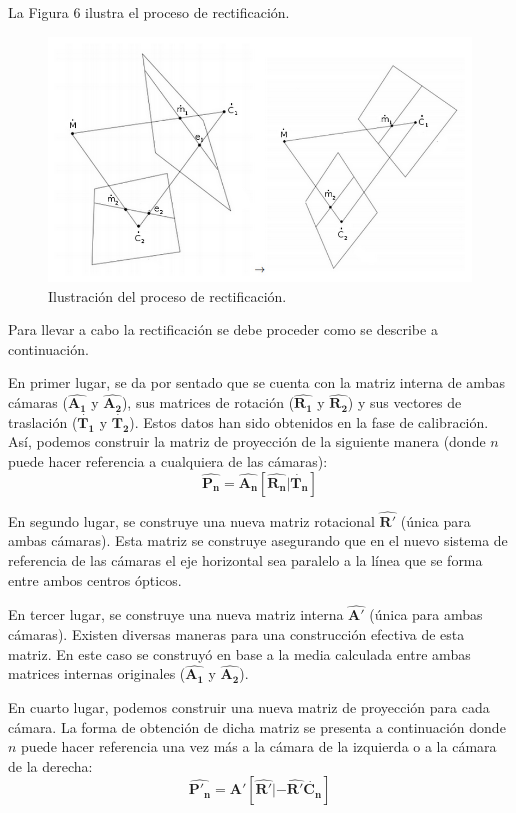 \documentclass[11pt,a4paper,titlepage]{article}
\newcommand{\Mat}[1]{\ensuremath{\mathbf{\hat{#1}}}}
\newcommand{\ThreeCart}[1]{\ensuremath{\mathbf{\dot{#1}}}}
\newcommand{\Figure}[1]{Figura #1}
\begin{document}
La \Figure{6} ilustra el proceso de rectificación.


\begin{figure}[h!]

  \centering
    \includegraphics[width=1\textwidth]{f6.png}
  \caption{Ilustración del proceso de rectificación.}
\end{figure}

Para llevar a cabo la rectificación se debe proceder como se describe a continuación.

En primer lugar, se da por sentado que se cuenta con la matriz interna de ambas cámaras (\Mat{A_1} y \Mat{A_2}), sus matrices de rotación (\Mat{R_1} y \Mat{R_2}) y sus vectores de traslación (\ThreeCart{T_1} y \ThreeCart{T_2}). Estos datos han sido obtenidos en la fase de calibración. Así, podemos construir la matriz de proyección de la siguiente manera (donde $n$ puede hacer referencia a cualquiera de las cámaras):
\[
	\Mat{P_n} = \Mat{A_n} \left[ \Mat{R_n} | \ThreeCart{T_n} \right]
\]

En segundo lugar, se construye una nueva matriz rotacional \Mat{R'} (única para ambas cámaras). Esta matriz se construye asegurando que en el nuevo sistema de referencia de las cámaras el eje horizontal sea paralelo a la línea que se forma entre ambos centros ópticos.

En tercer lugar, se construye una nueva matriz interna \Mat{A'} (única para ambas cámaras). Existen diversas maneras para una construcción efectiva de esta matriz. En este caso se construyó en base a la media calculada entre ambas matrices internas originales (\Mat{A_1} y \Mat{A_2}).

En cuarto lugar, podemos construir una nueva matriz de proyección para cada cámara. La forma de obtención de dicha matriz se presenta a continuación donde $n$ puede hacer referencia una vez más a la cámara de la izquierda o a la cámara de la derecha:
\[
	\Mat{P'_n} = \Mat{A'} \left[ \Mat{R'} | -\Mat{R'} \ThreeCart{C_n} \right]
\]
\end{document}
